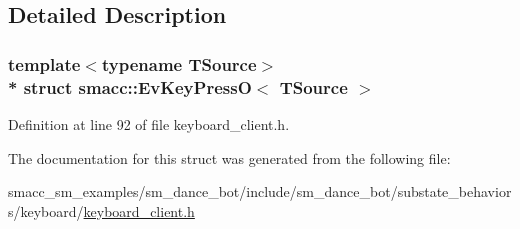 \subsection{Detailed Description}
\subsubsection*{template$<$typename T\+Source$>$\\*
struct smacc\+::\+Ev\+Key\+Press\+O$<$ T\+Source $>$}



Definition at line 92 of file keyboard\+\_\+client.\+h.



The documentation for this struct was generated from the following file\+:\begin{DoxyCompactItemize}
\item 
smacc\+\_\+sm\+\_\+examples/sm\+\_\+dance\+\_\+bot/include/sm\+\_\+dance\+\_\+bot/substate\+\_\+behaviors/keyboard/\hyperlink{keyboard__client_8h}{keyboard\+\_\+client.\+h}\end{DoxyCompactItemize}
